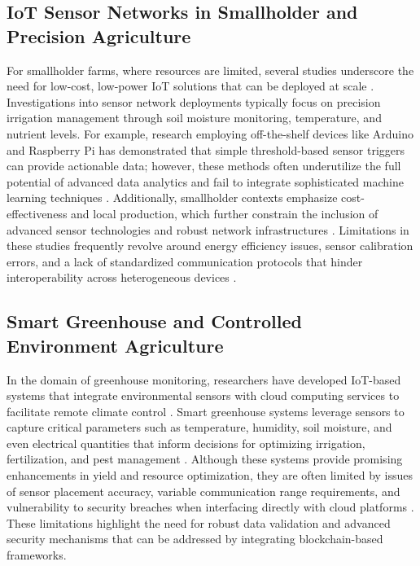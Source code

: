 \documentclass[12pt,onecolumn]{IEEEtran} %
\begin{document}
  \subsection{IoT Sensor Networks in Smallholder and Precision Agriculture}\label{subsec:lit-sensornets}
For smallholder farms, where resources are limited, several studies underscore the need for low-cost, low-power IoT solutions that can be deployed at scale \cite{abunadi2022trafficawaresecuredcooperative, bayih2022utilizationofinternet}. Investigations into sensor network deployments typically focus on precision irrigation management through soil moisture monitoring, temperature, and nutrient levels. For example, research employing off-the-shelf devices like Arduino and Raspberry Pi has demonstrated that simple threshold-based sensor triggers can provide actionable data; however, these methods often underutilize the full potential of advanced data analytics and fail to integrate sophisticated machine learning techniques \cite{bayih2022utilizationofinternet, bayih2022utilizationofinternet}. Additionally, smallholder contexts emphasize cost-effectiveness and local production, which further constrain the inclusion of advanced sensor technologies and robust network infrastructures \cite{bayih2022utilizationofinternet, bayih2022utilizationofinternet}. Limitations in these studies frequently revolve around energy efficiency issues, sensor calibration errors, and a lack of standardized communication protocols that hinder interoperability across heterogeneous devices \cite{bayih2022utilizationofinternet, bayih2022utilizationofinternet}.
  \subsection{Smart Greenhouse and Controlled Environment Agriculture}\label{subsec:lit-greenhouse}
In the domain of greenhouse monitoring, researchers have developed IoT-based systems that integrate environmental sensors with cloud computing services to facilitate remote climate control \cite{viswanatha2022implementationofiot, simo2022smartagricultureiotbased}. Smart greenhouse systems leverage sensors to capture critical parameters such as temperature, humidity, soil moisture, and even electrical quantities that inform decisions for optimizing irrigation, fertilization, and pest management \cite{simo2022smartagricultureiotbased}. Although these systems provide promising enhancements in yield and resource optimization, they are often limited by issues of sensor placement accuracy, variable communication range requirements, and vulnerability to security breaches when interfacing directly with cloud platforms \cite{viswanatha2022implementationofiot, abunadi2022trafficawaresecuredcooperative}. These limitations highlight the need for robust data validation and advanced security mechanisms that can be addressed by integrating blockchain-based frameworks.
\end{document}
